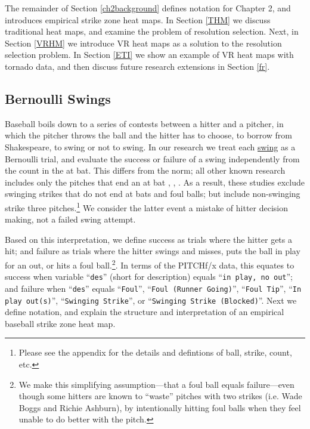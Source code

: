 The remainder of Section \ref{ch2background} defines notation for Chapter 2, and introduces empirical strike zone heat maps. In Section \ref{THM} we discuss traditional heat maps, and examine the problem of resolution selection. Next, in Section \ref{VRHM} we introduce VR heat maps as a solution to the resolution selection problem. In Section \ref{ETI} we show an example of VR heat maps with tornado data, and then discuss future research extensions in Section \ref{fr}.

\subsection{Bernoulli Swings}

Baseball boils down to a series of contests between a hitter and a pitcher, in which the pitcher throws the ball and the hitter has to choose, to borrow from Shakespeare, to swing or not to swing. In our research we treat each \underline{swing} as a Bernoulli trial, and evaluate the success or failure of a swing independently from the count in the at bat. This differs from the norm; all other known research includes only the pitches that end an at bat \citep{Cross2015}, \citep{Baumer2010}, \citep{Fast2011}. As a result, these studies exclude swinging strikes that do not end at bats and foul balls; but include non-swinging strike three pitches.\footnote{Please see the appendix for the details and defintions of ball, strike, count, etc.} We consider the latter event a mistake of hitter decision making, not a failed swing attempt. 

Based on this interpretation, we define success as trials where the hitter gets a hit; and failure as trials where the hitter swings and misses, puts the ball in play for an out, or hits a foul ball.\footnote{We make this simplifying assumption---that a foul ball equals failure---even though some hitters are known to ``waste'' pitches with two strikes (i.e. Wade Boggs and Richie Ashburn), by intentionally hitting foul balls when they feel unable to do better with the pitch. }. In terms of the PITCHf/x\textsuperscript{\textregistered} data, this equates to success when variable ``\verb|des|'' (short for description)  equals ``\verb|in play, no out|''; and failure when ``\verb|des|'' equals ``\verb|Foul|'', ``\verb|Foul (Runner Going)|'', ``\verb|Foul Tip|'', ``\verb|In play out(s)|'', ``\verb|Swinging Strike|'', or ``\verb|Swinging Strike (Blocked)|''. Next we define notation, and explain the structure and interpretation of an empirical baseball strike zone heat map.

